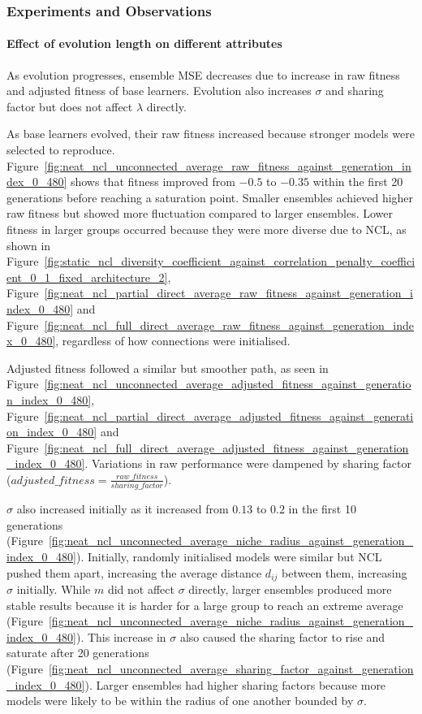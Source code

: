\subsubsection{Experiments and Observations}
\label{subsubsec:evaluation_neat_ncl_observations}
\paragraph{Effect of evolution length on different attributes}
As evolution progresses, ensemble MSE decreases due to increase in raw fitness and adjusted fitness of base learners. Evolution also increases $\sigma$ and sharing factor but does not affect $\lambda$ directly. 

As base learners evolved, their raw fitness increased because stronger models were selected to reproduce. Figure~\ref{fig:neat_ncl_unconnected_average_raw_fitness_against_generation_index_0_480} shows that fitness improved from $-0.5$ to $-0.35$ within the first 20 generations before reaching a saturation point. Smaller ensembles achieved higher raw fitness but showed more fluctuation compared to larger ensembles. Lower fitness in larger groups occurred because they were more diverse due to NCL, as shown in Figure~\ref{fig:static_ncl_diversity_coefficient_against_correlation_penalty_coefficient_0_1_fixed_architecture_2}, Figure~\ref{fig:neat_ncl_partial_direct_average_raw_fitness_against_generation_index_0_480} and Figure~\ref{fig:neat_ncl_full_direct_average_raw_fitness_against_generation_index_0_480}, regardless of how connections were initialised. 

Adjusted fitness followed a similar but smoother path, as seen in Figure~\ref{fig:neat_ncl_unconnected_average_adjusted_fitness_against_generation_index_0_480}, Figure~\ref{fig:neat_ncl_partial_direct_average_adjusted_fitness_against_generation_index_0_480} and Figure~\ref{fig:neat_ncl_full_direct_average_adjusted_fitness_against_generation_index_0_480}. Variations in raw performance were dampened by sharing factor ($adjusted\_fitness = \frac{raw\_fitness}{sharing\_factor}$). 

$\sigma$ also increased initially as it increased from $0.13$ to $0.2$ in the first 10 generations (Figure~\ref{fig:neat_ncl_unconnected_average_niche_radius_against_generation_index_0_480}). Initially, randomly initialised models were similar but NCL pushed them apart, increasing the average distance $d_{ij}$ between them, increasing $\sigma$ initially. While $m$ did not affect $\sigma$ directly, larger ensembles produced more stable results because it is harder for a large group to reach an extreme average (Figure~\ref{fig:neat_ncl_unconnected_average_niche_radius_against_generation_index_0_480}). This increase in $\sigma$ also caused the sharing factor to rise and saturate after 20 generations (Figure~\ref{fig:neat_ncl_unconnected_average_sharing_factor_against_generation_index_0_480}). Larger ensembles had higher sharing factors because more models were likely to be within the radius of one another bounded by $\sigma$. 

